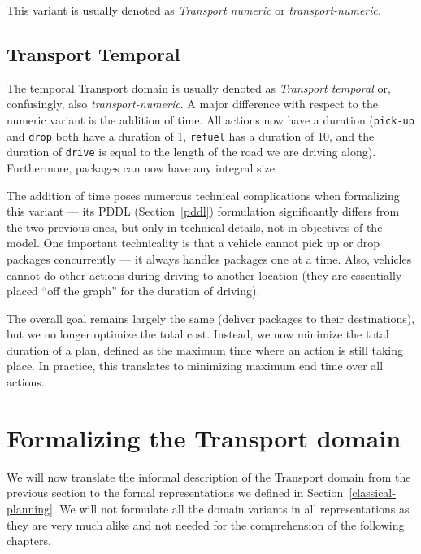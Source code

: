 This variant is usually denoted as \textit{Transport numeric} or \textit{transport-numeric}.

\subsection{Transport Temporal}\label{transport-temporal}

The temporal Transport domain is usually denoted as \textit{Transport temporal} or, confusingly,
also \textit{transport-numeric}. A major difference with respect to the numeric variant is
the addition of time. All actions now have a duration (\verb+pick-up+ and \verb+drop+ both have a
duration of 1, \verb+refuel+ has a duration of 10, and the duration of \verb+drive+ is
equal to the length of the road we are driving along). Furthermore, packages can now have any integral size.

The addition of time poses numerous technical complications when formalizing this variant
--- its PDDL (Section~\ref{pddl}) formulation significantly differs from the two previous ones, but only in technical details, not in objectives of the model.
One important technicality is that a vehicle cannot pick up or drop packages concurrently --- it always handles packages one at a time. Also, vehicles cannot do other actions during driving to another location (they are essentially placed ``off the graph'' for the duration of driving).

The overall goal remains largely the same (deliver packages to their destinations), but we no longer optimize the total cost. Instead, we now minimize the total duration of a plan,
defined as the maximum time where an action is still taking place.
In practice, this translates to minimizing maximum end time over all actions.



















\section{Formalizing the Transport domain}

We will now translate the informal description of the Transport domain from the previous section to the formal representations we defined in Section~\ref{classical-planning}. We will not formulate all the domain variants in all representations as
they are very much alike and not needed for the comprehension of the following chapters.

